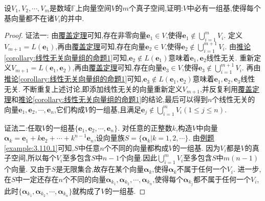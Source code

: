 \documentclass[../../main.tex]{subfiles}%
\begin{document}
\begin{corollary}\label{corollary:真子空间外仍有一组基存在}
设\(V_1,V_2,\cdots,V_m\)是数域\(\mathbb{F}\)上向量空间\(V\)的\(m\)个真子空间,证明:\(V\)中必有一组基,使得每个基向量都不在诸\(V_i\)的并中.
\end{corollary}
\begin{proof}

{\color{blue}证法一:}
由\hyperref[theorem:覆盖定理]{覆盖定理}可知,存在非零向量\(\boldsymbol{e}_1\in V\),使得\(\boldsymbol{e}_1\notin\bigcup_{i = 1}^{m}V_i\). 定义\(V_{m + 1}=L(\boldsymbol{e}_1)\),再由\hyperref[theorem:覆盖定理]{覆盖定理}可知,存在向量\(\boldsymbol{e}_2\in V\),使得\(\boldsymbol{e}_2\notin\bigcup_{i = 1}^{m + 1}V_i\). 由\hyperref[corollary:线性无关向量组的命题1]{推论\ref{corollary:线性无关向量组的命题1}}可知,\(\boldsymbol{e}_2\notin L(\boldsymbol{e}_1)\)意味着\(\boldsymbol{e}_1,\boldsymbol{e}_2\)线性无关. 重新定义\(V_{m + 1}=L(\boldsymbol{e}_1,\boldsymbol{e}_2)\),再由\hyperref[theorem:覆盖定理]{覆盖定理}可知,存在向量\(\boldsymbol{e}_3\in V\),使得\(\boldsymbol{e}_3\notin\bigcup_{i = 1}^{m + 1}V_i\). 再由\hyperref[corollary:线性无关向量组的命题1]{推论\ref{corollary:线性无关向量组的命题1}}可知,\(\boldsymbol{e}_3\notin L(\boldsymbol{e}_1,\boldsymbol{e}_2)\)意味着\(\boldsymbol{e}_1,\boldsymbol{e}_2,\boldsymbol{e}_3\)线性无关. 不断重复上述讨论,即添加线性无关的向量重新定义\(V_{m + 1}\),并反复利用\hyperref[theorem:覆盖定理]{覆盖定理}和\hyperref[corollary:线性无关向量组的命题1]{推论\ref{corollary:线性无关向量组的命题1}}的结论,最后可以得到\(n\)个线性无关的向量\(\boldsymbol{e}_1,\boldsymbol{e}_2,\cdots,\boldsymbol{e}_n\),它们构成\(V\)的一组基,且满足\(\boldsymbol{e}_j\notin\bigcup_{i = 1}^{m}V_i(1\leqslant  j\leqslant  n)\). 

{\color{blue}证法二:}任取\(V\)的一组基\(\{\boldsymbol{e}_1,\boldsymbol{e}_2,\cdots,\boldsymbol{e}_n\}\). 对任意的正整数\(k\),构造\(V\)中向量\(\boldsymbol{\alpha}_k=\boldsymbol{e}_1 + k\boldsymbol{e}_2+\cdots + k^{n - 1}\boldsymbol{e}_n\),设向量族\(S = \{\boldsymbol{\alpha}_k|k = 1,2,\cdots\}\). 由\hyperref[example:3.110.1]{例题\ref{example:3.110.1}}可知,\(S\)中任意\(n\)个不同的向量都构成\(V\)的一组基. 因为\(V_i\)都是\(V\)的真子空间,所以每个\(V_i\)至多包含\(S\)中\(n - 1\)个向量.因此$\bigcup_{i=1}^m{V_i}$至多包含$S$中$m(n-1)$个向量.
又由于\(S\)是无限集合,故存在某个向量\(\boldsymbol{\alpha}_k\),使得\(\boldsymbol{\alpha}_k\)不属于任何一个\(V_i\).
进一步,在\(S\)中一定还存在\(n\)个不同的向量\(\boldsymbol{\alpha}_{k_1},\boldsymbol{\alpha}_{k_2},\cdots,\boldsymbol{\alpha}_{k_n}\),使得每个\(\boldsymbol{\alpha}_{k_j}\)都不属于任何一个\(V_i\),此时\(\{\boldsymbol{\alpha}_{k_1},\boldsymbol{\alpha}_{k_2},\cdots,\boldsymbol{\alpha}_{k_n}\}\)就构成了\(V\)的一组基.
\end{proof}
\end{document}
